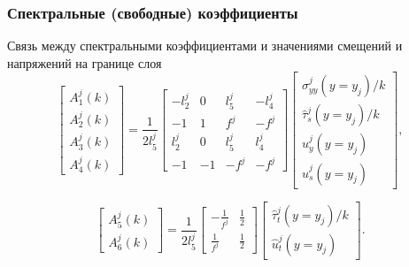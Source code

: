 \begin{frame}
    \frametitle{Спектральные (свободные) коэффициенты}
    Связь между спектральными коэффициентами и значениями смещений и напряжений на границе слоя
    \begin{equation*}
        \left[
        \begin{array}{c}
        A^{j}_{1}(k) \\
        A^{j}_{2}(k)\\
        A^{j}_{3}(k) \\
        A^{j}_{4}(k)
        \end{array}
        \right]
        = \frac{1}{2l^j_5}
        \left[
        \begin{array}{cccc}
            -l^j_2 & 0 & l^j_5 & -l^j_4 \\
            -1 & 1 & f^j & -f^j \\
            l^j_2 & 0 & l^j_5 & l^j_4 \\
            -1 & -1 & -f^j & -f^j
        \end{array}
        \right]
        \left[
        \begin{array}{c}
        \hat{\sigma}^{j}_{yy}(y=y_j)/k \\
        \hat{\tau}^{j}_{s}(y=y_j)/k\\
        \hat{u}^{j}_{y}(y=y_j) \\
        \hat{u}^{j}_{s}(y=y_j) 
        \end{array}
        \right],
    \end{equation*}

    \begin{equation*}
        \left[
        \begin{array}{c}
            A^{j}_{5}(k) \\
            A^{j}_{6}(k)
        \end{array}
        \right]
        = \frac{1}{2l^j_5}
        \left[
        \begin{array}{cc}
            -\frac{1}{f^j} & \frac{1}{2} \\
            \frac{1}{f^j} & \frac{1}{2}
        \end{array}
        \right]
        \left[
        \begin{array}{c}
        \hat{\tau}^{j}_{t}(y=y_j)/k\\
        \hat{u}^{j}_{t}(y=y_j) 
        \end{array}
        \right].
    \end{equation*}
\end{frame}

